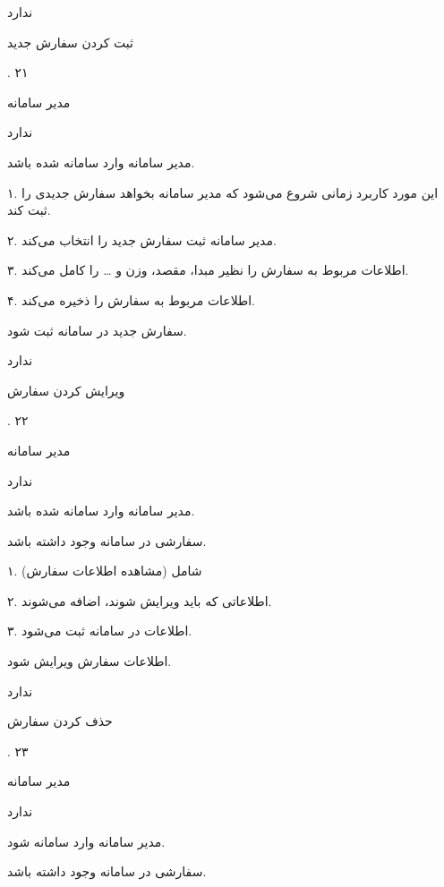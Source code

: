 ندارد

\noindent \hrulefill

ثبت کردن سفارش جدید

.
۲۱

مدیر سامانه

ندارد

مدیر سامانه وارد سامانه شده باشد.


۱. این مورد کاربرد زمانی شروع می‌شود که مدیر سامانه بخواهد سفارش جدیدی را ثبت کند.

۲. مدیر سامانه ثبت سفارش جدید را انتخاب می‌کند.

۳. اطلاعات مربوط به سفارش را نظیر مبدا، مقصد، وزن و … را کامل می‌کند.

۴. اطلاعات مربوط به سفارش را ذخیره می‌کند.

سفارش جدید در سامانه ثبت شود.

ندارد 


\noindent \hrulefill

ویرایش کردن سفارش

.
۲۲

مدیر سامانه

ندارد


مدیر سامانه وارد سامانه شده باشد.

سفارشی در سامانه وجود داشته باشد.


۱. شامل (مشاهده اطلاعات سفارش)

۲. اطلاعاتی که باید ویرایش شوند، اضافه می‌شوند.

۳. اطلاعات در سامانه ثبت می‌شود.

اطلاعات سفارش ویرایش شود.

ندارد

\noindent \hrulefill

حذف کردن سفارش

.
۲۳

مدیر سامانه

ندارد

مدیر سامانه وارد سامانه شود.

سفارشی در سامانه وجود داشته باشد.

